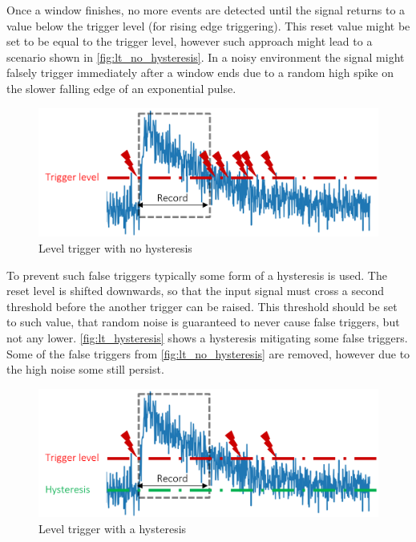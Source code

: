 Once a window finishes, no more events are detected
until the signal returns to a value below the trigger level
(for rising edge triggering). This reset value might be 
set to be equal to the trigger level, however such approach
might lead to a scenario shown in \autoref{fig:lt_no_hysteresis}.
In a noisy environment the signal might falsely trigger immediately after
a window ends due to a random high spike on the slower falling edge of
an exponential pulse.
\begin{figure}[H]
  \centering
  \includegraphics[width=.7\linewidth]{media/lt_no_hysteresis.png}
  \caption{Level trigger with no hysteresis}
  \label{fig:lt_no_hysteresis}
\end{figure}


To prevent such false triggers typically some form of a hysteresis is used.
The reset level is shifted downwards, so that the input signal must cross
a second threshold before the another trigger can be raised.
This threshold should be set to such value, that random noise is guaranteed
to never cause false triggers, but not any lower.
\autoref{fig:lt_hysteresis} shows a hysteresis mitigating some false triggers.
Some of the false triggers from \autoref{fig:lt_no_hysteresis} are removed, however 
due to the high noise some still persist.
\begin{figure}[H]
  \centering
  \includegraphics[width=.7\linewidth]{media/lt_hysteresis.png}
  \caption{Level trigger with a hysteresis}
  \label{fig:lt_hysteresis} 
\end{figure}


